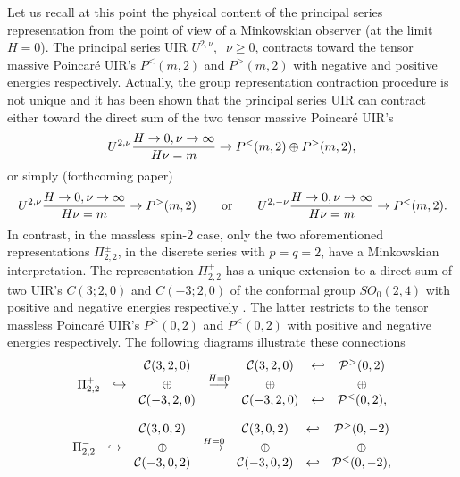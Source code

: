 \documentclass[a4paper,11pt,showpacs,preprintnumbers]{revtex4}
\begin{document}
Let us recall at this point the physical content of the principal
series representation from the point of view of a Minkowskian
observer (at the limit $H=0$). The principal series UIR
$U^{2,\nu},\;\;\nu \geq 0$, contracts toward the tensor massive
Poincar\'e UIR's $P^<(m,2)$ and $P^>(m,2)$ with negative and
positive energies respectively. Actually, the group representation
contraction procedure is not unique and it has been shown that the
principal series UIR can contract either toward the direct sum of
the two tensor massive Poincar\'e UIR's \cite{mini}
\begin{equation}
U^{2,\nu} {{H\rightarrow 0,\nu \rightarrow\infty} \over
H\nu=m}\rightarrow P^<(m,2)\oplus P^>(m,2),
\end{equation}
or simply (forthcoming paper)
\begin{equation} U^{2,\nu}
{{H\rightarrow 0,\nu \rightarrow\infty} \over H\nu=m}\rightarrow
 P^>(m,2)\qquad\mbox{or}\qquad U^{2,-\nu} {{H\rightarrow 0,\nu
\rightarrow\infty} \over H\nu=m}\rightarrow P^<(m,2).
\end{equation}
In contrast, in the massless spin-$2$ case, only the two
aforementioned representations $\Pi^{\pm}_{2,2}$, in the discrete
series with $p=q=2$, have a Minkowskian interpretation. The
representation $\Pi^+_{2,2}$ has a unique extension to a direct
sum of two UIR's $C(3;2,0)$ and $C(-3;2,0)$ of the conformal group
$SO_0(2,4)$ with positive and negative energies respectively
\cite{babo,anla}. The latter restricts to the tensor massless
Poincar\'e UIR's $P^>(0, 2)$ and $P^<(0,2)$ with positive and
negative energies respectively. The following diagrams illustrate
these connections
\begin{equation}
\left.
\begin{array}{ccccccc}
&& {\cal C}(3,2,0)& &{\cal C}(3,2,0)&\hookleftarrow &{\cal P}^{>}(0,2)\\
\Pi^+_{2,2} &\hookrightarrow &\oplus&\stackrel{H=0}{\longrightarrow} & \oplus  & &\oplus\\
&& {\cal C}(-3,2,0)& & {\cal C}(-3,2,0) &\hookleftarrow &{\cal
P}^{<}(0,2),\\
\end{array}
\right.
\end{equation}

\begin{equation}
\left.
\begin{array}{ccccccc}
&& {\cal C}(3,0,2)& &{\cal C}(3,0,2)&\hookleftarrow &{\cal P}^{>}(0,-2)\\
\Pi^-_{2,2} &\hookrightarrow &\oplus&\stackrel{H=0}{\longrightarrow}&\oplus &&\oplus\\
&& {\cal C}(-3,0,2)&& {\cal C}(-3,0,2)&\hookleftarrow &{\cal P}^{<}(0,-2),\\
\end{array}
\right.
\end{equation}
\end{document}
